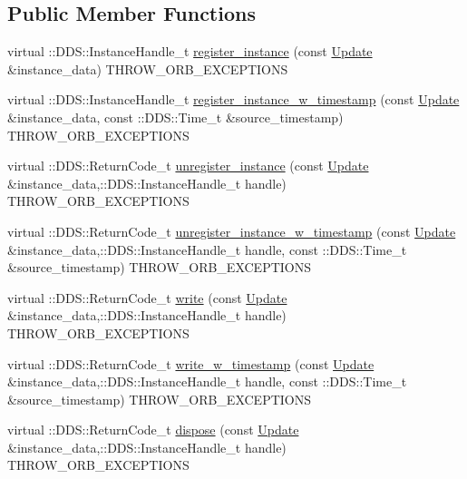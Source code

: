\subsection*{Public Member Functions}
\begin{DoxyCompactItemize}
\item 
virtual ::DDS::InstanceHandle\_\-t \hyperlink{classKnowledge_1_1UpdateDataWriter__impl_a81c627094b6112bade6c6677d4768f98}{register\_\-instance} (const \hyperlink{structKnowledge_1_1Update}{Update} \&instance\_\-data) THROW\_\-ORB\_\-EXCEPTIONS
\item 
virtual ::DDS::InstanceHandle\_\-t \hyperlink{classKnowledge_1_1UpdateDataWriter__impl_ae880ecd0b81e01435fc8342bc9321f1b}{register\_\-instance\_\-w\_\-timestamp} (const \hyperlink{structKnowledge_1_1Update}{Update} \&instance\_\-data, const ::DDS::Time\_\-t \&source\_\-timestamp) THROW\_\-ORB\_\-EXCEPTIONS
\item 
virtual ::DDS::ReturnCode\_\-t \hyperlink{classKnowledge_1_1UpdateDataWriter__impl_a068ec171bea0ade2ce7b71fef95b168a}{unregister\_\-instance} (const \hyperlink{structKnowledge_1_1Update}{Update} \&instance\_\-data,::DDS::InstanceHandle\_\-t handle) THROW\_\-ORB\_\-EXCEPTIONS
\item 
virtual ::DDS::ReturnCode\_\-t \hyperlink{classKnowledge_1_1UpdateDataWriter__impl_a81ea8166e413ebcd93d205e3e9201704}{unregister\_\-instance\_\-w\_\-timestamp} (const \hyperlink{structKnowledge_1_1Update}{Update} \&instance\_\-data,::DDS::InstanceHandle\_\-t handle, const ::DDS::Time\_\-t \&source\_\-timestamp) THROW\_\-ORB\_\-EXCEPTIONS
\item 
virtual ::DDS::ReturnCode\_\-t \hyperlink{classKnowledge_1_1UpdateDataWriter__impl_a14a15ef3f731425aaa159fcce86418ab}{write} (const \hyperlink{structKnowledge_1_1Update}{Update} \&instance\_\-data,::DDS::InstanceHandle\_\-t handle) THROW\_\-ORB\_\-EXCEPTIONS
\item 
virtual ::DDS::ReturnCode\_\-t \hyperlink{classKnowledge_1_1UpdateDataWriter__impl_ac1e15bd0254991e1ee769478689f6257}{write\_\-w\_\-timestamp} (const \hyperlink{structKnowledge_1_1Update}{Update} \&instance\_\-data,::DDS::InstanceHandle\_\-t handle, const ::DDS::Time\_\-t \&source\_\-timestamp) THROW\_\-ORB\_\-EXCEPTIONS
\item 
virtual ::DDS::ReturnCode\_\-t \hyperlink{classKnowledge_1_1UpdateDataWriter__impl_a4f51138b9f6b2f9ba4ddb64a8e2f387a}{dispose} (const \hyperlink{structKnowledge_1_1Update}{Update} \&instance\_\-data,::DDS::InstanceHandle\_\-t handle) THROW\_\-ORB\_\-EXCEPTIONS

\end{DoxyCompactItemize}
